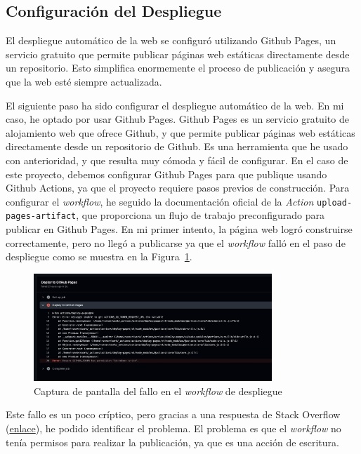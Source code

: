 \documentclass{article}
\begin{document}
\subsection{Configuración del Despliegue}\label{subsec:configuracion-del-despliegue}

El despliegue automático de la web se configuró utilizando Github Pages, un servicio gratuito que permite publicar páginas web estáticas directamente desde un repositorio. Esto simplifica enormemente el proceso de publicación y asegura que la web esté siempre actualizada.

El siguiente paso ha sido configurar el despliegue automático de la web. En mi caso, he optado por usar Github Pages. Github Pages es un servicio gratuito de alojamiento web que ofrece Github, y que permite publicar páginas web estáticas directamente desde un repositorio de Github. Es una herramienta que he usado con anterioridad, y que resulta muy cómoda y fácil de configurar. En el caso de este proyecto, debemos configurar Github Pages para que publique usando Github Actions, ya que el proyecto requiere pasos previos de construcción. Para configurar el \textit{workflow}, he seguido la documentación oficial de la \textit{Action} \texttt{upload-pages-artifact}, que proporciona un flujo de trabajo preconfigurado para publicar en Github Pages. En mi primer intento, la página web logró construirse correctamente, pero no llegó a publicarse ya que el \textit{workflow} falló en el paso de despliegue como se muestra en la Figura~\ref{fig:workflow-fail}.

\begin{figure}[h!]
    \centering
    \includegraphics[width=0.8\textwidth]{./img/p1/workflow-failed}
    \caption{Captura de pantalla del fallo en el \textit{workflow} de despliegue}
    \label{fig:workflow-fail}
\end{figure}

Este fallo es un poco críptico, pero gracias a una respuesta de Stack Overflow (\href{https://stackoverflow.com/a/74167257}{enlace}), he podido identificar el problema. El problema es que el \textit{workflow} no tenía permisos para realizar la publicación, ya que es una acción de escritura.
\end{document}
